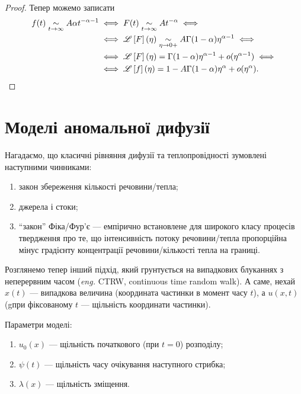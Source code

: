 \begin{proof}
    Тепер можемо записати
    \begin{equation}
        \begin{aligned}
            f(t) \underset{t \to \infty}{\sim} A \alpha t^{-\alpha - 1}
            &\iff F(t) \underset{t \to \infty}{\sim} A t^{-\alpha} \iff \\
            &\iff \mathscr{L}\left[F\right](\eta) \underset{\eta \to 0+}{\sim} A \Gamma(1 - \alpha) \eta^{\alpha - 1} \iff \\
            &\iff \mathscr{L}\left[F\right](\eta) = \Gamma(1 - \alpha) \eta^{\alpha - 1} + o(\eta^{\alpha - 1}) \iff \\
            &\iff \mathscr{L}\left[f\right](\eta) = 1 - A \Gamma(1 - \alpha) \eta^{\alpha} + o(\eta^{\alpha}).
        \end{aligned}
    \end{equation}
\end{proof}

\section{Моделі аномальної дифузії}


Нагадаємо, що класичні рівняння дифузії та теплопровідності зумовлені наступними чинниками:
\begin{enumerate}
    \item закон збереження кількості речовини/тепла;
    \item джерела і стоки;
    \item ``закон'' Фіка/Фур'є --- емпірично встановлене для широкого класу процесів твердження про те, що інтенсивність потоку речовини/тепла пропорційна мінус градієнту концентрації речовини/кількості тепла на границі.
\end{enumerate}

Розглянемо тепер інший підхід, який грунтується на випадкових блуканнях з неперервним часом (\textit{eng.} CTRW, continuous time random walk). А саме, нехай $x(t)$ --- випадкова величина (координата частинки в момент часу $t$), а  $u(x, t)$ (gпри фіксованому $t$ --- щільність координати частинки). \medskip


Параметри моделі:
\begin{enumerate}
    \item $u_0(x)$ --- щільність початкового (при $t = 0$) розподілу;
    \item $\psi(t)$ --- щільність часу очікування наступного стрибка;
    \item $\lambda(x)$ --- щільність зміщення.
\end{enumerate}


